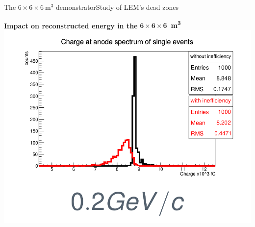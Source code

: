 \documentclass[10pt]{beamer}
\begin{document}
\begin{frame}{The \texorpdfstring{$6 \times 6 \times \SI{6}{\meter\cubed}$}{666} demonstrator}{Study of LEM's dead zones}
\begin{scriptsize}
\begin{minipage}{0.58\textwidth}
\begin{minipage}{0.48\textwidth}
    			\end{minipage}\hfill
    			\begin{minipage}{0.48\textwidth}
    				\centering
    				\textbf{Impact on reconstructed energy in the} $\mathbf{6 \times 6 \times} $\textbf{\SI[detect-weight]{6}{\meter\cubed}}\\
    				\includegraphics[width=\textwidth]{figures/666/electron.png}
    			\end{minipage}
    		\end{minipage}
    	\end{scriptsize} 
    \end{frame}
\end{document}
